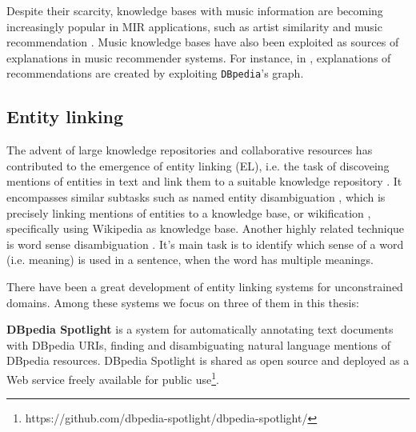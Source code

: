 Despite their scarcity, knowledge bases with music information are becoming increasingly popular in MIR applications, such as artist similarity and music recommendation \citep{Celma2008,Leal2012,Ostuni2013}.
Music knowledge bases have also been exploited as sources of explanations in music recommender systems. %
For instance, in \citep{Passant2010}, explanations of recommendations are created by exploiting \texttt{DBpedia}'s graph.%


\subsection{Entity linking}
\label{sec:SOA:nlu:entity_linking}

The advent of large knowledge repositories and collaborative resources has contributed to the emergence of entity linking (EL), i.e. the task of discoveing mentions of entities in text and link them to a suitable knowledge repository \citep{Moroetal2014}. 
It encompasses similar subtasks such as named entity disambiguation \citep{BunescuandPasca2006}, which is precisely linking mentions of entities to a knowledge base, or wikification \citep{MihalceaandCsomai2007}, specifically using Wikipedia as knowledge base.
Another highly related technique is word sense disambiguation \citep{stevenson2003word}. It's main task is to identify which sense of a word (i.e. meaning) is used in a sentence, when the word has multiple meanings.

There have been a great development of entity linking systems for unconstrained domains. Among these systems we focus on three of them in this thesis:

\noindent \textbf{DBpedia Spotlight} \citep{Mendes2011} is a system for automatically annotating text documents with DBpedia URIs, finding and disambiguating natural language mentions of DBpedia resources. DBpedia Spotlight is shared as open source and deployed as a Web service freely available for public use\footnote{https://github.com/dbpedia-spotlight/dbpedia-spotlight/}.

